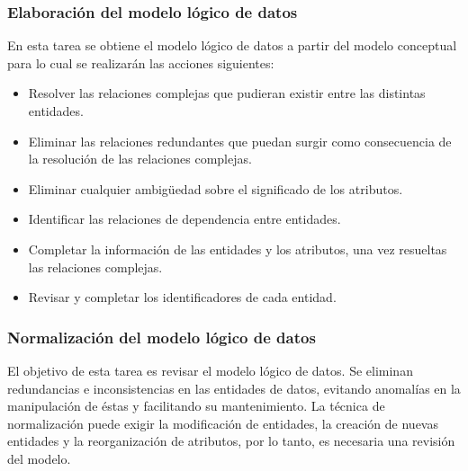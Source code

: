 \documentclass[11pt,a4paper,spanish,twoside]{report}
\begin{document}
\subsubsection{Elaboración del modelo lógico de datos}
En esta tarea se obtiene el modelo lógico de datos a partir del modelo
conceptual para lo cual se realizarán las acciones siguientes:
\begin{itemize}

\item Resolver las relaciones complejas que pudieran existir entre las
  distintas entidades.
\item Eliminar las relaciones redundantes que puedan surgir como consecuencia
  de la resolución de las relaciones complejas.
\item Eliminar cualquier ambigüedad sobre el significado de los atributos.
\item Identificar las relaciones de dependencia entre entidades.
\item Completar la información de las entidades y los atributos, una vez
  resueltas las relaciones complejas.
\item Revisar y completar los identificadores de cada entidad.
\end{itemize}

\subsubsection{Normalización del modelo lógico de datos}
El objetivo de esta tarea es revisar el modelo lógico de datos. Se eliminan
redundancias e inconsistencias en las entidades de datos, 
evitando anomalías en la manipulación de éstas y facilitando su
mantenimiento. La técnica de normalización puede exigir la modificación de
entidades, la creación de nuevas entidades y la reorganización de atributos,
por lo tanto, es necesaria una revisión del modelo.
\end{document}
